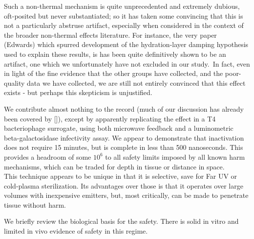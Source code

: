 \documentclass[paper.tex]{subfiles}
\begin{document}
\begin{multicols}{1}
Such a non-thermal mechanism is quite unprecedented and extremely dubious, oft-posited but never substantiated; so it has taken some convincing that this is not a particularly abstruse artifact, especially when considered in the context of the broader non-thermal effects literature. For instance, the very paper (Edwards) which spurred development of the hydration-layer damping hypothesis used to explain these results, is has been quite\cite{Resonances1987} definitively\cite{Microwave1993a} shown to be an artifact, one which we unfortunately have not excluded in our study.\footnotemark \ In fact, even in light of the fine evidence that the other groups have collected, and the poor-quality data we have collected, we are still not entirely convinced that this effect exists - but perhaps this skepticism is unjustified.\\


We contribute almost nothing to the record (much of our discussion has already been covered by []), except by apparently replicating the effect in a T4 bacteriophage surrogate, using both microwave feedback and a luminometric beta-galactosidase infectivity assay. We appear to demonstrate that inactivation does not require 15 minutes, but is complete in less than 500 nanoseconds. This provides a headroom of some $10^6$ to all safety limits imposed by all known harm mechanisms, which can be traded for depth in tissue or distance in space. \\

This technique appears to be unique in that it is selective, save for Far UV or cold-plasma sterilization. Its advantages over those is that it operates over large volumes with inexpensive emitters, but, most critically, can be made to penetrate tissue without harm.

We briefly review the biological basis for the safety. There is solid in vitro and limited in vivo evidence of safety in this regime.



\end{multicols}
\end{document}

